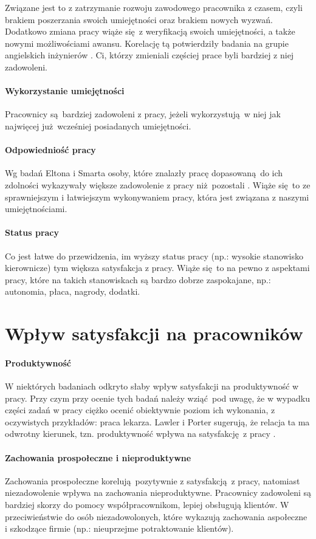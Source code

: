 Związane jest to z zatrzymanie rozwoju zawodowego pracownika z czasem, czyli brakiem poszerzania swoich umiejętności oraz brakiem nowych wyzwań. Dodatkowo zmiana pracy wiąże się z weryfikacją swoich umiejętności, a także nowymi możliwościami awansu. Korelację tą potwierdziły badania na grupie angielskich inżynierów \cite{newton1991further}. Ci, którzy zmieniali częściej prace byli bardziej z niej zadowoleni.
\paragraph{Wykorzystanie umiejętności} Pracownicy są bardziej zadowoleni z pracy, jeżeli wykorzystują w niej jak najwięcej już wcześniej posiadanych umiejętności.
\paragraph{Odpowiedniość pracy} Wg badań Eltona i Smarta osoby, które znalazły pracę dopasowaną do ich zdolności wykazywały większe zadowolenie z pracy niż pozostali \cite{elton1988extrinsic}. Wiąże się to ze sprawniejszym i łatwiejszym wykonywaniem pracy, która jest związana z naszymi umiejętnościami.
\paragraph{Status pracy} Co jest łatwe do przewidzenia, im wyższy status pracy (np.: wysokie stanowisko kierownicze) tym większa satysfakcja z pracy. Wiąże się to na pewno z aspektami pracy, które na takich stanowiskach są bardzo dobrze zaspokajane, np.: autonomia, płaca, nagrody, dodatki.

\section{Wpływ satysfakcji na pracowników}
\label{sec:theory-sat-infl}
\paragraph{Produktywność} W niektórych badaniach odkryto słaby wpływ satysfakcji na produktywność w pracy. Przy czym przy ocenie tych badań należy wziąć pod uwagę, że w wypadku części zadań w pracy ciężko ocenić obiektywnie poziom ich wykonania, z oczywistych przykładów: praca lekarza. Lawler i Porter sugerują, że relacja ta ma odwrotny kierunek, tzn. produktywność wpływa na satysfakcję z pracy \cite{lawler1967effect}.
\paragraph{Zachowania prospołeczne i nieproduktywne} Zachowania prospołeczne korelują pozytywnie z satysfakcją z pracy, natomiast niezadowolenie wpływa na zachowania nieproduktywne. Pracownicy zadowoleni są bardziej skorzy do pomocy współpracownikom, lepiej obsługują klientów. W przeciwieństwie do osób niezadowolonych, które wykazują zachowania aspołeczne i szkodzące firmie (np.: nieuprzejme potraktowanie klientów).
